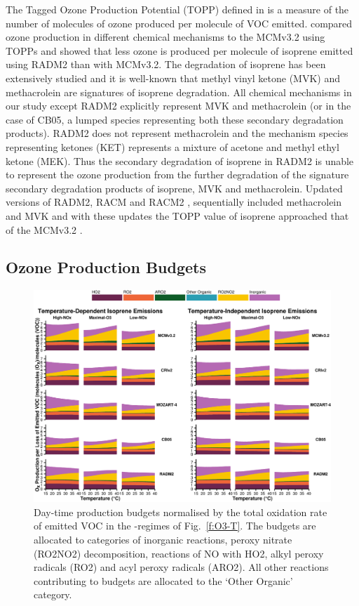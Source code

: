 The Tagged Ozone Production Potential (TOPP) defined in \citet{Butler:2011} is a measure of the number of molecules of ozone produced per molecule of VOC emitted.
\citet{Coates:2015} compared ozone production in different chemical mechanisms to the MCMv3.2 using TOPPs and showed that less ozone is produced per molecule of isoprene emitted using RADM2 than with MCMv3.2.
The degradation of isoprene has been extensively studied and it is well-known that methyl vinyl ketone (MVK) and methacrolein are signatures of isoprene degradation.
All chemical mechanisms in our study except RADM2 explicitly represent MVK and methacrolein (or in the case of CB05, a lumped species representing both these secondary degradation products).
RADM2 does not represent methacrolein and the mechanism species representing ketones (KET) represents a mixture of acetone and methyl ethyl ketone (MEK). 
Thus the secondary degradation of isoprene in RADM2 is unable to represent the ozone production from the further degradation of the signature secondary degradation products of isoprene, MVK and methacrolein.
Updated versions of RADM2, RACM \citep{Stockwell:1997} and RACM2 \citep{Goliff:2013}, sequentially included methacrolein and MVK and with these updates the TOPP value of isoprene approached that of the MCMv3.2 \citep{Coates:2015}.

\subsection{Ozone Production Budgets} \label{ss:r_budgets}

\begin{figure}[t]%
    \centering%
    \caption{Day-time  production budgets normalised by the total oxidation rate of emitted VOC in the -regimes of Fig.~\ref{f:O3-T}. The budgets are allocated to categories of inorganic reactions, peroxy nitrate (RO2NO2) decomposition, reactions of NO with HO2, alkyl peroxy radicals (RO2) and acyl peroxy radicals (ARO2). All other reactions contributing to  budgets are allocated to the `Other Organic' category.}%
    \label{f:ozone_budgets}%
    \includegraphics[width=\textwidth]{img/Ox_budgets}
\end{figure}

